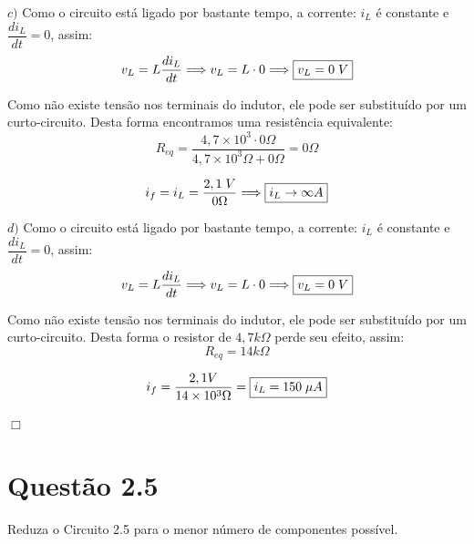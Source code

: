 \documentclass[
	12pt,				%
	oneside,			%
	a4paper,			%
	english,			%
	french,				%
	spanish,			%
	brazil				%
	]{abntex2}
\begin{document}
\newpage

$c)$ Como o circuito está ligado por bastante tempo, a corrente: $i_L$ é constante e $\dfrac{d i_L}{dt} = 0$, assim:
\begin{equation}
    \centering
    v_L = L\dfrac{d i_L}{dt} \Longrightarrow v_L = L \cdot 0 \Longrightarrow \fbox{$v_L = 0\;V$}
\end{equation}

Como não existe tensão nos terminais do indutor, ele pode ser substituído por um curto-circuito. Desta forma encontramos uma resistência equivalente:
$$R_{eq} = \dfrac{4,7 \times 10^3 \cdot 0 \Omega}{4,7 \times 10^3 \Omega + 0 \Omega} = 0\Omega$$

\begin{equation}
    i_f = i_L =  \dfrac{2,1\;V}{0 \Omega} \Longrightarrow \fbox{$i_L \rightarrow \infty A$}
\end{equation}

$d)$ Como o circuito está ligado por bastante tempo, a corrente: $i_L$ é constante e $\dfrac{d i_L}{dt} = 0$, assim:
\begin{equation}
    \centering
    v_L = L\dfrac{d i_L}{dt} \Longrightarrow v_L = L \cdot 0 \Longrightarrow \fbox{$v_L = 0\;V$}
\end{equation}

Como não existe tensão nos terminais do indutor, ele pode ser substituído por um curto-circuito. Desta forma o resistor de $4,7 k \Omega$ perde seu efeito, assim:
$$R_{eq} = 14 k \Omega$$


\begin{equation}
    i_f =  \dfrac{2,1 V}{14 \times 10^3 \Omega} = \fbox{$i_L = 150\;\mu A$}
\end{equation}

\begin{flushright}
    $\Box$
\end{flushright}
\newpage
\section*{Questão 2.5}
Reduza o Circuito 2.5 para o menor número de componentes possível.
\end{document}
